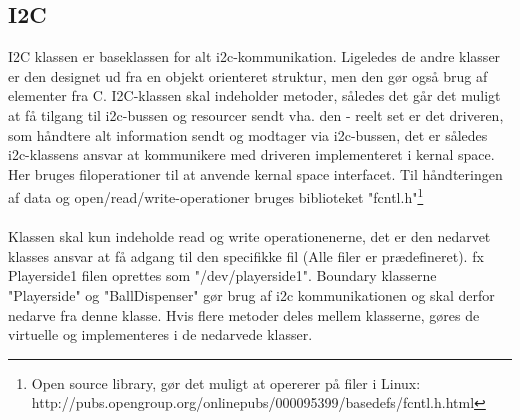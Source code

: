 \documentclass[Softwaredesign/Softwaredesign_main.tex]{subfiles}
\begin{document}
\subsection{I2C}
I2C klassen er baseklassen for alt i2c-kommunikation. Ligeledes de andre klasser er den designet ud fra en objekt orienteret struktur, men den gør også brug af elementer fra C. I2C-klassen skal indeholder metoder, således det går det muligt at få tilgang til i2c-bussen og resourcer sendt vha. den - reelt set er det driveren, som håndtere alt information sendt og modtager via i2c-bussen, det er således i2c-klassens ansvar at kommunikere med driveren implementeret i kernal space. Her bruges filoperationer til at anvende kernal space interfacet. Til håndteringen af data og open/read/write-operationer bruges biblioteket "fcntl.h"\footnote{Open source library, gør det muligt at opererer på filer i Linux: http://pubs.opengroup.org/onlinepubs/000095399/basedefs/fcntl.h.html} \\\\
Klassen skal kun indeholde read og write operationenerne, det er den nedarvet klasses ansvar at få adgang til den specifikke fil (Alle filer er prædefineret). fx Playerside1 filen oprettes som "/dev/playerside1". Boundary klasserne "Playerside" og "BallDispenser"  gør brug af i2c kommunikationen og skal derfor nedarve fra denne klasse. Hvis flere metoder deles mellem klasserne, gøres de virtuelle og implementeres i de nedarvede klasser. 
\end{document}
